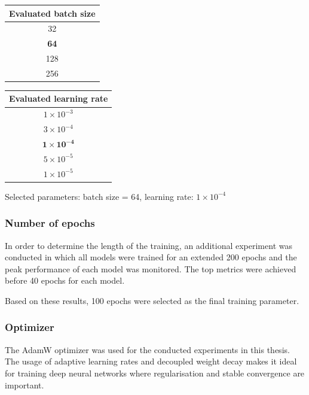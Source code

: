 \begin{table}[H]
\centering

\begin{minipage}{0.45\textwidth}
\centering
\begin{tabular}{c}
\toprule
\textbf{Evaluated batch size} \\
\midrule
32 \\
\textbf{64} \\
128 \\
256 \\
\bottomrule
\end{tabular}
\end{minipage}
\hfill
\begin{minipage}{0.45\textwidth}
\centering
\begin{tabular}{c}
\toprule
\textbf{Evaluated learning rate} \\
\midrule
$1 \times 10^{-3}$ \\
$3 \times 10^{-4}$ \\
$\mathbf{1 \times 10^{-4}}$ \\
$5 \times 10^{-5}$ \\
$1 \times 10^{-5}$ \\
\bottomrule
\end{tabular}
\end{minipage}

\end{table}

Selected parameters: batch size = 64, learning rate: $1 \times 10^{-4}$


\subsubsection{Number of epochs}

In order to determine the length of the training, an additional experiment was conducted in which all models were trained for an extended 200 epochs and the peak performance of each model was monitored. The top metrics were achieved before 40 epochs for each model. 

Based on these results, 100 epochs were selected as the final training parameter.

\subsubsection{Optimizer}

The AdamW optimizer was used for the conducted experiments in this thesis. The usage of adaptive learning rates and decoupled weight decay makes it ideal for training deep neural networks where regularisation and stable convergence are important. 

